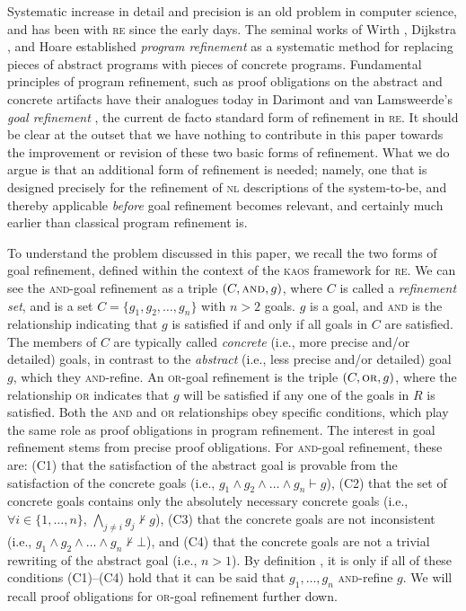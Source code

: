 \documentclass[10pt, conference, compsocconf]{IEEEtran}
\begin{document}
Systematic increase in detail and precision is an old problem in computer science, and has been with \textsc{re} since the early days. The seminal works of Wirth \cite{Wirth:1971:CACM}, Dijkstra \cite{Dijkstra:1972}, and Hoare \cite{Hoare:1972:AInf} established \textit{program refinement} as a systematic method for replacing pieces of abstract programs with pieces of concrete programs. Fundamental principles of program refinement, such as proof obligations on the abstract and concrete artifacts have their analogues today in Darimont and van Lamsweerde's \textit{goal refinement} \cite{Darimont+:1996:FSE}, the current de facto standard form of refinement in \textsc{re}. It should be clear at the outset that we have nothing to contribute in this paper towards the improvement or revision of these two basic forms of refinement. What we do argue is that an additional form of refinement is needed; namely, one that is designed precisely for the refinement of \textsc{nl} descriptions of the system-to-be, and thereby applicable \textit{before} goal refinement becomes relevant, and certainly much earlier than classical program refinement is. 

To understand the problem discussed in this paper, we recall the two forms of goal refinement, defined within the context of the \textsc{kaos} framework \cite{Dardenne+:1993:SCP} for \textsc{re}. We can see the \textsc{and}-goal refinement as a triple $(C, \textsc{and}, g)$, where $C$ is called a \textit{refinement set}, and is a set $C = \{ g_{1}, g_{2}, \ldots, g_{n} \}$ with $n > 2$ goals. $g$ is a goal, and \textsc{and} is the relationship indicating that $g$ is satisfied if and only if all goals in $C$ are satisfied. The members of $C$ are typically called \textit{concrete} (i.e., more precise and/or detailed) goals, in contrast to the \textit{abstract} (i.e., less precise and/or detailed) goal $g$, which they \textsc{and}-refine. An \textsc{or}-goal refinement is the triple $(C, \textsc{or}, g)$, where the relationship \textsc{or} indicates that $g$ will be satisfied if any one of the goals in $R$ is satisfied. Both the \textsc{and} and \textsc{or} relationships obey specific conditions, which play the same role as proof obligations in program refinement. The interest in goal refinement stems from precise proof obligations. For \textsc{and}-goal refinement, these are: (C1) that the satisfaction of the abstract goal is provable from the satisfaction of the concrete goals (i.e., $g_{1} \wedge g_{2} \wedge \ldots \wedge g_{n} \vdash g$), (C2) that the set of concrete goals contains only the absolutely necessary concrete goals (i.e., $\forall i \in \{1, \ldots, n\}$, $\bigwedge_{j \neq i} g_{j} \not\vdash g$), (C3) that the concrete goals are not inconsistent (i.e., $g_{1} \wedge g_{2} \wedge \ldots \wedge g_{n} \not\vdash \bot$), and (C4) that the concrete goals are not a trivial rewriting of the abstract goal (i.e., $n > 1$). By definition \cite{Darimont+:1996:FSE}, it is only if all of these conditions (C1)--(C4) hold that it can be said that $g_{1}, \ldots, g_{n}$ \textsc{and}-refine $g$. We will recall proof obligations for \textsc{or}-goal refinement further down.
\end{document}
